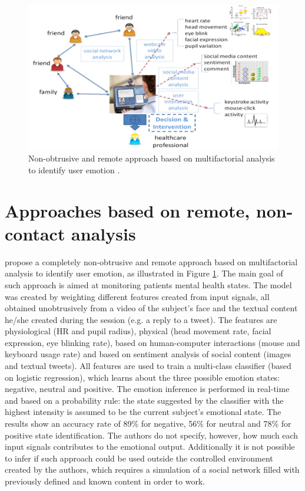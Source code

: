 \begin{figure}
\centering
\includegraphics[width=0.9\linewidth]{figures/zhou.png}
\caption{Non-obtrusive and remote approach based on multifactorial analysis to identify user emotion \textcite{mental}.}
\label{fig:zhou}
\end{figure}

\section{Approaches based on remote, non-contact analysis}

\textcite{mental} propose a completely non-obtrusive and remote approach based on multifactorial analysis to identify user emotion, as illustrated in Figure \ref{fig:zhou}. The main goal of such approach is aimed at monitoring patients mental health states. The model was created by weighting different features created from input signals, all obtained unobtrusively from a video of the subject's face and the textual content he/she created during the session (e.g. a reply to a tweet). The features are physiological (HR and pupil radius), physical (head movement rate, facial expression, eye blinking rate), based on human-computer interactions (mouse and keyboard usage rate) and based on sentiment analysis of social content (images and textual tweets). All features are used to train a multi-class classifier (based on logistic regression), which learns about the three possible emotion states: negative, neutral and positive. The emotion inference is performed in real-time and based on a probability rule: the state suggested by the classifier with the highest intensity is assumed to be the current subject's emotional state. The results show an accuracy rate of 89\% for negative, 56\% for neutral and 78\% for positive state identification. The authors do not specify, however, how much each input signals contributes to the emotional output. Additionally it is not possible to infer if such approach could be used outside the controlled environment created by the authors, which requires a simulation of a social network filled with previously defined and known content in order to work.

